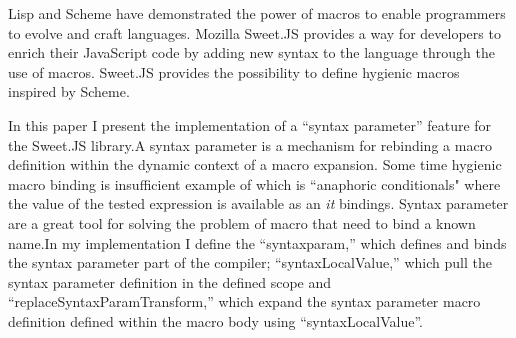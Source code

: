 Lisp and Scheme have demonstrated the power of macros to enable programmers to evolve and craft languages. Mozilla Sweet.JS provides a way for developers to enrich their JavaScript code by adding new syntax to the language through the use of macros. Sweet.JS provides the possibility to define hygienic macros inspired by Scheme.

In this paper I present the implementation of a ``syntax parameter'' feature for the Sweet.JS library.A syntax parameter is a mechanism for rebinding a macro definition within the dynamic context of a macro expansion. Some time hygienic macro binding is insufficient example of which is ``anaphoric conditionals" where the value of the tested expression is available as an {\it it} bindings. Syntax parameter are a great tool for solving the problem of macro that need to bind a known name.In my implementation I define the ``syntaxparam,'' which defines and binds the syntax parameter part of the compiler; ``syntaxLocalValue,'' which pull the syntax parameter definition in the defined scope and ``replaceSyntaxParamTransform,'' which expand the syntax parameter macro definition defined within the macro body using ``syntaxLocalValue''.